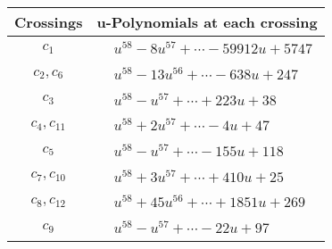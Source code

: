 \documentclass[1p]{elsarticle_modified}
\theoremstyle{definition}
\begin{document}
\begin{tabular}{m{50pt}|m{274pt}}
Crossings & \hspace{64pt}u-Polynomials at each crossing \\
\hline $$\begin{aligned}c_{1}\end{aligned}$$&$\begin{aligned}
&u^{58}-8 u^{57}+\cdots-59912 u+5747
\end{aligned}$\\
\hline $$\begin{aligned}c_{2},c_{6}\end{aligned}$$&$\begin{aligned}
&u^{58}-13 u^{56}+\cdots-638 u+247
\end{aligned}$\\
\hline $$\begin{aligned}c_{3}\end{aligned}$$&$\begin{aligned}
&u^{58}- u^{57}+\cdots+223 u+38
\end{aligned}$\\
\hline $$\begin{aligned}c_{4},c_{11}\end{aligned}$$&$\begin{aligned}
&u^{58}+2 u^{57}+\cdots-4 u+47
\end{aligned}$\\
\hline $$\begin{aligned}c_{5}\end{aligned}$$&$\begin{aligned}
&u^{58}- u^{57}+\cdots-155 u+118
\end{aligned}$\\
\hline $$\begin{aligned}c_{7},c_{10}\end{aligned}$$&$\begin{aligned}
&u^{58}+3 u^{57}+\cdots+410 u+25
\end{aligned}$\\
\hline $$\begin{aligned}c_{8},c_{12}\end{aligned}$$&$\begin{aligned}
&u^{58}+45 u^{56}+\cdots+1851 u+269
\end{aligned}$\\
\hline $$\begin{aligned}c_{9}\end{aligned}$$&$\begin{aligned}
&u^{58}- u^{57}+\cdots-22 u+97
\end{aligned}$\\
\hline
\end{tabular}\\~\\
\end{document}
